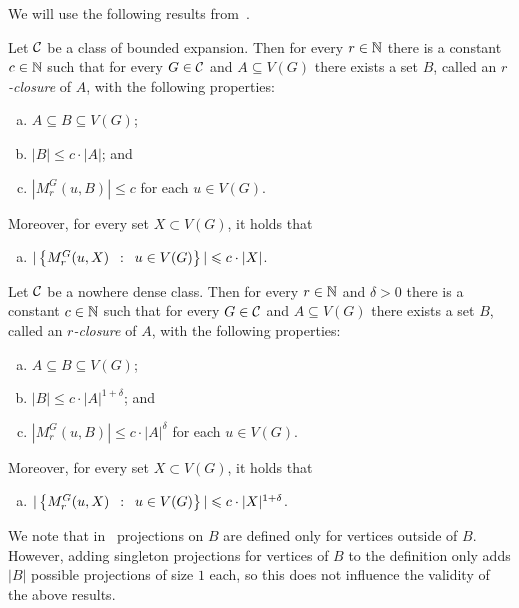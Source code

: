 We will use the following results from~\cite{drange2016kernelization,eickmeyer2016neighborhood}.

\begin{lemma}\label{lem:closure-be}
Let $\mathcal{C}$ be a class of bounded expansion. 
Then for every $r\in \mathbb{N}$ there is a constant $c\in \mathbb{N}$ such that for
every $G\in \mathcal{C}$ and $A\subseteq V(G)$ there exists a set $B$, called an {\em{$r$-closure}} of $A$, with the following properties:
\begin{enumerate}[(a)]
  \item $A\subseteq B\subseteq V(G)$;
  \item $|B|\leq c\cdot |A|$; and
  \item $|M_r^G(u,B)|\leq c$ for each $u\in V(G)$.
  \end{enumerate}
  Moreover, for every set $X\subset V(G)$, it holds that
  \begin{enumerate}[(d)]
  \item $|\left\{M_r^G(u,X) \,~:~\, u\in V(G) \right\}|\leqslant c\cdot |X|$.
\end{enumerate}
\end{lemma}

\begin{lemma}\label{lem:closure-nd}
Let $\mathcal{C}$ be a nowhere dense class. 
Then for every $r\in\mathbb{N}$ and $\delta>0$ there is a 
constant $c\in\mathbb{N}$ such that for every $G\in \mathcal{C}$ and $A\subseteq V(G)$ there exists a set 
$B$,  called an {\em{$r$-closure}} of $A$, 
with the following properties: 
\begin{enumerate}[(a)]
  \item $A\subseteq B\subseteq V(G)$;
  \item $|B|\leq c\cdot |A|^{1+\delta}$; and
  \item $|M_r^G(u,B)|\leq c\cdot |A|^{\delta}$ for each $u\in V(G)$.
  \end{enumerate}
  Moreover, for every set $X\subset V(G)$, it holds that
  \begin{enumerate}[(d)]  
  \item $|\left\{M_r^G(u,X) \,~:~\, u\in V(G) \right\}|\leqslant c\cdot |X|^{1+\delta}$.
\end{enumerate}
\end{lemma}

We note that in~\cite{drange2016kernelization,eickmeyer2016neighborhood} projections on $B$ are defined only for vertices outside of $B$. 
However, adding singleton projections for vertices of $B$ to the definition only adds $|B|$ possible projections of size $1$ each, so this does not influence the validity of the above results.


